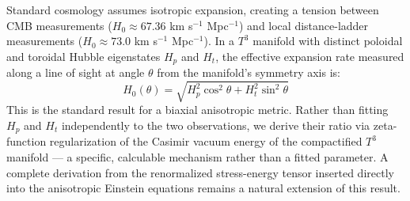 \documentclass[aps,prd,10pt,twocolumn,superscriptaddress,nofootinbib,floatfix]{revtex4-2}
\begin{document}
Standard cosmology assumes isotropic expansion, creating a tension between CMB measurements ($H_0 \approx 67.36$ km s$^{-1}$ Mpc$^{-1}$) and local distance-ladder measurements ($H_0 \approx 73.0$ km s$^{-1}$ Mpc$^{-1}$). In a $T^3$ manifold with distinct poloidal and toroidal Hubble eigenstates $H_p$ and $H_t$, the effective expansion rate measured along a line of sight at angle $\theta$ from the manifold's symmetry axis is:
\begin{equation}
H_0(\theta) = \sqrt{H_p^2\cos^2\theta + H_t^2\sin^2\theta}
\end{equation}
This is the standard result for a biaxial anisotropic metric. Rather than fitting $H_p$ and $H_t$ independently to the two observations, we derive their ratio via zeta-function regularization of the Casimir vacuum energy of the compactified $T^3$ manifold --- a specific, calculable mechanism rather than a fitted parameter. A complete derivation from the renormalized stress-energy tensor inserted directly into the anisotropic Einstein equations remains a natural extension of this result.
\end{document}
